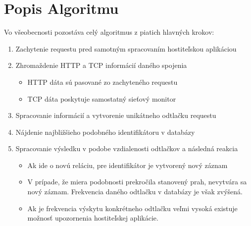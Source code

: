 \documentclass[
  printed, %
  table,   %
  lof,     %
  lot,     %
]{fithesis3}
\begin{document}
\section{Popis Algoritmu}
Vo všeobecnosti pozostáva celý algoritmus z piatich hlavných krokov:
\begin{enumerate}
  \item Zachytenie requestu pred samotným spracovaním hostiteľskou aplikáciou
  \item Zhromaždenie HTTP a TCP informácií daného spojenia
  \begin{itemize}
    \item HTTP dáta sú pasované zo zachyteného requestu
    \item TCP dáta poskytuje samostatný sieťový monitor
  \end{itemize}
  \item Spracovanie informácií a vytvorenie unikátneho odtlačku requestu
  \item Nájdenie najbližšieho podobného identifikátoru v databázy
  \item Spracovanie výsledku v podobe vzdialenosti odtlačkov a následná reakcia
  \begin{itemize}
    \item Ak ide o novú reláciu, pre identifikátor je vytvorený nový záznam
    \item V prípade, že miera podobnosti prekročila stanovený prah, nevytvára
    sa nový záznam. Frekvencia daného odtlačku v databázy je však zvýšená.
    \item Ak je frekvencia výskytu konkrétneho odtlačku veľmi vysoká existuje
    možnosť upozornenia hostiteľskej aplikácie.
  \end{itemize}
\end{enumerate}

\end{document}
